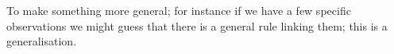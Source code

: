 To make something more general; for instance
if we have a few specific observations we might
guess that there is a general rule linking them;
this is a generalisation.